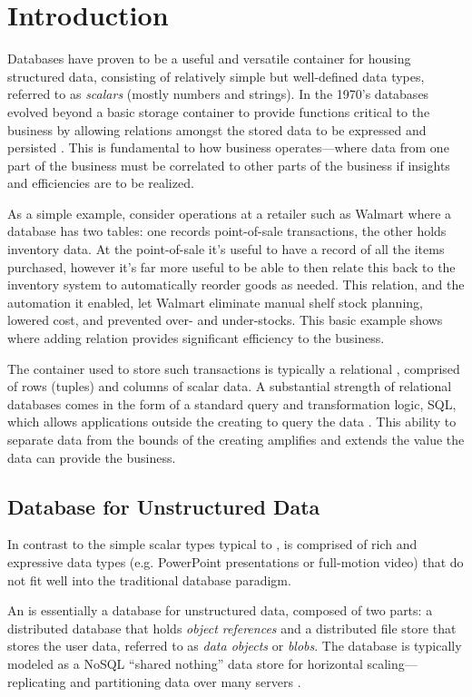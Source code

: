 
\section{Introduction} \label{s:intro}
Databases have proven to be a useful and versatile container for housing structured data, consisting of relatively simple but well-defined data types, referred to as \emph{scalars} (mostly numbers and strings).  In the 1970's databases evolved beyond a basic storage container to provide functions critical to the business by allowing relations amongst the stored data to be expressed and persisted \cite{Codd:1970:RMD:362384.362685}. This is fundamental to how business operates---where data from one part of the business must be correlated to other parts of the business if insights and efficiencies are to be realized.

As a simple example, consider operations at a retailer such as Walmart where a database has two tables: one records point-of-sale transactions, the other holds inventory data. At the point-of-sale it's useful to have a record of all the items purchased, however it's far more useful to be able to then relate this back to the inventory system to automatically reorder goods as needed. This relation, and the automation it enabled, let Walmart eliminate manual shelf stock planning, lowered cost, and prevented over- and under-stocks. This basic example shows where adding relation provides significant efficiency to the business.

The container used to store such transactions is typically a relational \db{}, comprised of rows (tuples) and columns of scalar data. A substantial strength of relational databases comes in the form of a standard query and transformation logic, SQL, which allows applications outside the creating \app{} to query the data \cite{Angles:2008:SGD:1322432.1322433}. This ability to separate data from the bounds of the creating \app{} amplifies and extends the value the data can provide the business.

\subsection{Database for Unstructured Data} \label{s:uddb}
In contrast to the simple scalar types typical to \sd{}, \ud{} is comprised of rich and expressive data types (e.g. PowerPoint presentations or full-motion video) that do not fit well into the traditional database paradigm.

An \os{} is essentially a database for unstructured data, composed of two parts: a distributed database that holds \emph{object references} and a distributed file store that stores the user data, referred to as \emph{data objects} or \emph{blobs}.  The database is typically modeled as a NoSQL ``shared nothing'' data store for horizontal scaling---replicating and partitioning data over many servers \cite{Cattell:2011:SSN:1978915.1978919}.

